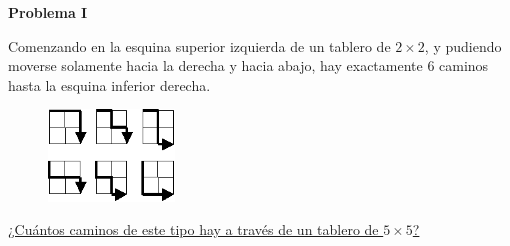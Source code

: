 \begin{center}
\Large \textbf{Problema I} \\
\end{center}

Comenzando en la esquina superior izquierda de un tablero de $2 \times 2$, y pudiendo moverse solamente hacia la derecha y hacia abajo,
hay exactamente $6$ caminos hasta la esquina inferior derecha.

\begin{figure}[H]
    \centering
    \includegraphics[width=0.3\textwidth]{caminos_grilla.png}
\end{figure}

\underline{¿Cuántos caminos de este tipo hay a través de un tablero de $5 \times 5$?}


